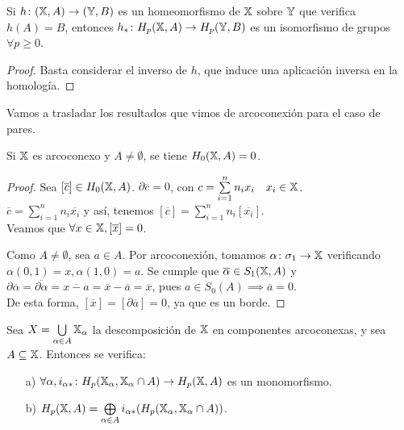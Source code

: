 \begin{corollary}
  Si $h \colon ({\mathbb X}, A) \to ({\mathbb Y}, B)$ es un homeomorfismo de ${\mathbb X}$ sobre ${\mathbb Y}$ que verifica $h(A) = B$, entonces
  $h_* \colon H_p({\mathbb X}, A) \to H_p({\mathbb Y}, B)$ es un isomorfismo de grupos $\forall p \geq 0$.
\end{corollary}

\begin{proof}
  Basta considerar el inverso de $h$, que induce una aplicación inversa en la homología.
\end{proof}

Vamos a trasladar los resultados que vimos de arcoconexión para el caso de pares.

\begin{proposition}
  Si ${\mathbb X}$ es arcoconexo y $A \neq \emptyset$, se tiene $H_0({\mathbb X}, A) = 0$.
\end{proposition}

\begin{proof}
  Sea $[\overline{c}] \in H_0({\mathbb X}, A)$. $\partial\overline{c} = 0$, con $c = \sum\limits_{i = 1}^n n_i x_i \quad x_i \in {\mathbb X}$. \\
  $\overline{c} = \sum\limits_{i = 1}^n n_i \overline{x_i}$ y así, tenemos $[\overline{c}] = \sum\limits_{i = 1}^n n_i [\overline{x_i}]$. \\
  Veamos que $\forall x \in {\mathbb X}, [\overline{x}] = 0$.

  Como $A \neq \emptyset$, sea $a \in A$. Por arcoconexión, tomamos $\alpha \colon \sigma_1 \to {\mathbb X}$ verificando $\alpha(0, 1) = x, \alpha(1, 0) = a$.
  Se cumple que $\overline{\alpha} \in S_1({\mathbb X}, A)$ y $\partial\overline{\alpha} = \overline{\partial\alpha} = \overline{x - a} = \overline{x} - \overline{a}
  = \overline{x}$, pues $a \in S_0(A) \implies \overline{a} = 0$. \\
  De esta forma, $[\overline{x}] = [\partial\overline{a}] = 0$, ya que es un borde.
\end{proof}

\begin{proposition}
  Sea $X = \bigcup\limits_{\alpha \in A} {\mathbb X}_\alpha$ la descomposición de ${\mathbb X}$ en componentes arcoconexas, y sea $A \subseteq {\mathbb X}$. Entonces se verifica:
  \begin{itemize}
    \item[a)] $\forall \alpha, i_{\alpha *} \colon H_p({\mathbb X}_\alpha, {\mathbb X}_\alpha \cap A) \to H_p({\mathbb X}, A)$ es un monomorfismo.
    \item[b)] $H_p({\mathbb X}, A) = \bigoplus\limits_{\alpha \in A}  i_{\alpha *}(H_p({\mathbb X}_\alpha, {\mathbb X}_\alpha \cap A))$.
  \end{itemize}
\end{proposition}


